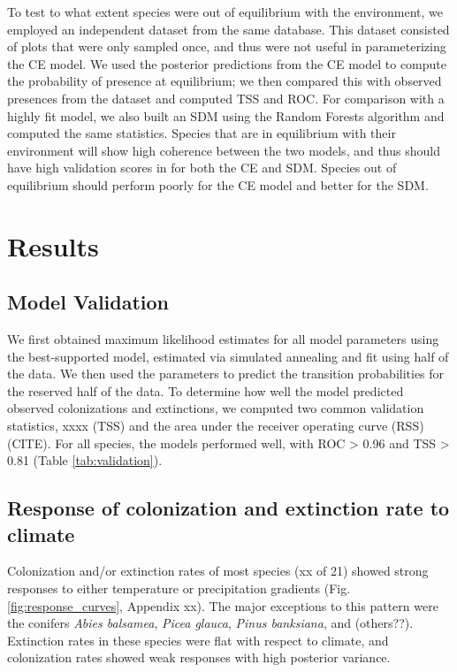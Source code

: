 \documentclass[11pt]{article}
\begin{document}
To test to what extent species were out of equilibrium with the environment, we employed an independent dataset from the same database.
This dataset consisted of plots that were only sampled once, and thus were not useful in parameterizing the CE model.
We used the posterior predictions from the CE model to compute the probability of presence at equilibrium; we then compared this with observed presences from the dataset and computed TSS and ROC.
For comparison with a highly fit model, we also built an SDM using the Random Forests algorithm and computed the same statistics.
Species that are in equilibrium with their environment will show high coherence between the two models, and thus should have high validation scores in for both the CE and SDM.
Species out of equilibrium should perform poorly for the CE model and better for the SDM.


\section*{Results}

\subsection*{Model Validation}
We first obtained maximum likelihood estimates for all model parameters using the best-supported model, estimated via simulated annealing and fit using half of the data.
We then used the parameters to predict the transition probabilities for the reserved half of the data.
To determine how well the model predicted observed colonizations and extinctions, we computed two common validation statistics, xxxx (TSS) and the area under the receiver operating curve (RSS) (CITE).
For all species, the models performed well, with ROC > 0.96 and TSS > 0.81 (Table \ref{tab:validation}).

\subsection*{Response of colonization and extinction rate to climate}
Colonization and/or extinction rates of most species (xx of 21) showed strong responses to either temperature or precipitation gradients (Fig. \ref{fig:response_curves}, Appendix xx).
The major exceptions to this pattern were the conifers \emph{Abies balsamea}, \emph{Picea glauca}, \emph{Pinus banksiana}, and (others??).
Extinction rates in these species were flat with respect to climate, and colonization rates showed weak responses with high posterior variance.
\end{document}
